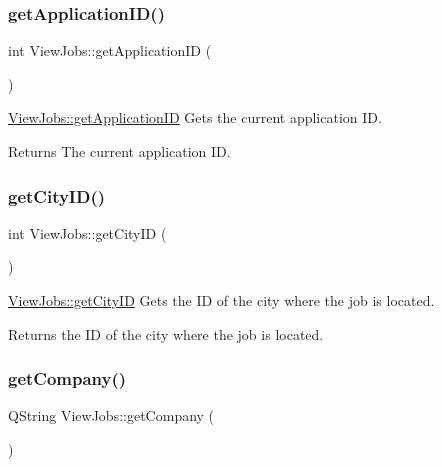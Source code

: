 \subsubsection{\texorpdfstring{get\+Application\+I\+D()}{getApplicationID()}}
{\footnotesize\ttfamily int View\+Jobs\+::get\+Application\+ID (\begin{DoxyParamCaption}{ }\end{DoxyParamCaption})}



\mbox{\hyperlink{class_view_jobs_a086650882ad80acb4074cf697f8cddcb}{View\+Jobs\+::get\+Application\+ID}} Gets the current application ID. 

\begin{DoxyReturn}{Returns}
The current application ID. 
\end{DoxyReturn}
\mbox{\label{class_view_jobs_adcafeca350b21a033aa630e042ee7947}} 
\subsubsection{\texorpdfstring{get\+City\+I\+D()}{getCityID()}}
{\footnotesize\ttfamily int View\+Jobs\+::get\+City\+ID (\begin{DoxyParamCaption}{ }\end{DoxyParamCaption})}



\mbox{\hyperlink{class_view_jobs_adcafeca350b21a033aa630e042ee7947}{View\+Jobs\+::get\+City\+ID}} Gets the ID of the city where the job is located. 

\begin{DoxyReturn}{Returns}
the ID of the city where the job is located. 
\end{DoxyReturn}
\mbox{\label{class_view_jobs_a88d7c0a7a79bc7a7e02b524587983bf8}} 
\subsubsection{\texorpdfstring{get\+Company()}{getCompany()}}
{\footnotesize\ttfamily Q\+String View\+Jobs\+::get\+Company (\begin{DoxyParamCaption}{ }\end{DoxyParamCaption})}



